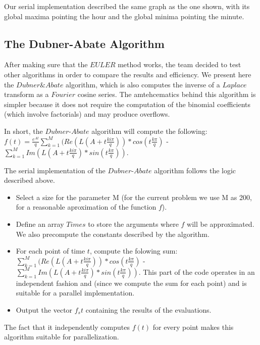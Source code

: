 Our serial implementation described the same graph as the one shown, with its global maxima pointing the hour and the global minima pointing the minute.


\subsection{The Dubner-Abate Algorithm}
After making sure that the $EULER$ method works, the team decided to test other algorithms in order to compare the results and efficiency.
We present here the $Dubner \& Abate$ algorithm, which is also computes the inverse of a $Laplace$ transform as a $Fourier$ cosine series.
The amtehcematics behind this algorithm is simpler because it does not require the computation of the binomial coefficients (which involve factorials)
and may produce overflows.

In short, the $Dubner$-$Abate$ algorithm will compute the following: 
$f(t) = \frac{e^{At}}{q} \sum\limits_{k=1}^{M}{(Re(L(A+t\frac{ki\pi}{q}))* cos(t\frac{k\pi}{q})}$ - $ \sum\limits_{k=1}^{M}{Im(L(A+t\frac{ki\pi}{q})* sin(t\frac{k\pi}{q}) )}$.
\newline

The  serial implementation of the $Dubner$-$Abate$ algorithm follows the logic described above.
\begin{itemize}
\item{Select a size for the parameter M (for the current problem we use M as 200, for a reasonable aproximation of the function $f$).}
\item{Define an array $Times$ to store the arguments where $f$ will be approximated. We also precompute the constants described by the algorithm.} 
\item{For each point of time $t$, compute the folowing sum: $\sum\limits_{k=1}^{M} {(Re(L(A+t\frac{ki\pi}{q}))* cos(t\frac{k\pi}{q})}$ - $ \sum\limits_{k=1}^{M}{Im(L(A+t\frac{ki\pi}{q})* sin(t\frac{k\pi}{q}) )}$. 
This part of the code operates in an independent fashion and (since we compute the sum for each point) and is suitable for a parallel implementation.}
\item{Output the vector $f_st$ containing the results of the evaluations.}
\end{itemize}
The fact that it independently computes $f(t)$  for every point makes this algorithm suitable for parallelization.








